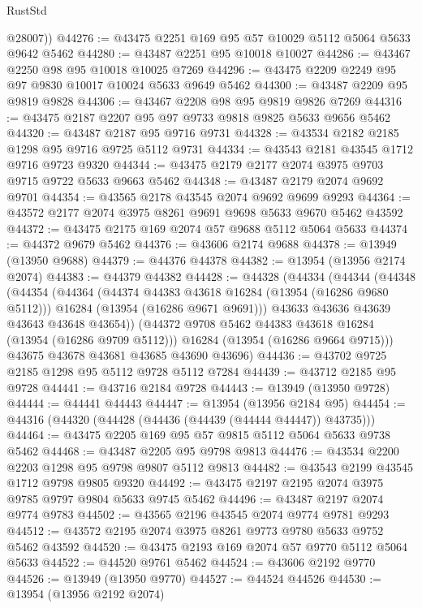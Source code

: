 \begin{lexlean}{RustStd}
\begin{coremodule}
        @28007))
@44276 := @43475 @2251 @169 @95 @57 @10029 @5112 @5064 @5633 @9642 @5462
@44280 := @43487 @2251 @95 @10018 @10027
@44286 := @43467 @2250 @98 @95 @10018 @10025 @7269
@44296 := @43475 @2209 @2249 @95 @97 @9830 @10017 @10024 @5633 @9649 @5462
@44300 := @43487 @2209 @95 @9819 @9828
@44306 := @43467 @2208 @98 @95 @9819 @9826 @7269
@44316 := @43475 @2187 @2207 @95 @97 @9733 @9818 @9825 @5633 @9656 @5462
@44320 := @43487 @2187 @95 @9716 @9731
@44328 := @43534 @2182 @2185 @1298 @95 @9716 @9725 @5112 @9731
@44334 := @43543 @2181 @43545 @1712 @9716 @9723 @9320
@44344 := @43475 @2179 @2177 @2074 @3975 @9703 @9715 @9722 @5633 @9663 @5462
@44348 := @43487 @2179 @2074 @9692 @9701
@44354 := @43565 @2178 @43545 @2074 @9692 @9699 @9293
@44364 := @43572 @2177 @2074 @3975 @8261 @9691 @9698 @5633 @9670 @5462 @43592
@44372 := @43475 @2175 @169 @2074 @57 @9688 @5112 @5064 @5633
@44374 := @44372 @9679 @5462
@44376 := @43606 @2174 @9688
@44378 := @13949 (@13950 @9688)
@44379 := @44376 @44378
@44382 := @13954 (@13956 @2174 @2074)
@44383 := @44379 @44382
@44428 := @44328
    (@44334
      (@44344
        (@44348
          (@44354
            (@44364
              (@44374 @44383 @43618 @16284 (@13954 (@16286 @9680 @5112)))
              @16284
              (@13954 (@16286 @9671 @9691)))
            @43633
            @43636
            @43639
            @43643
            @43648
            @43654))
        (@44372 @9708 @5462 @44383 @43618 @16284 (@13954 (@16286 @9709 @5112)))
        @16284
        (@13954 (@16286 @9664 @9715)))
      @43675
      @43678
      @43681
      @43685
      @43690
      @43696)
@44436 := @43702 @9725 @2185 @1298 @95 @5112 @9728 @5112 @7284
@44439 := @43712 @2185 @95 @9728
@44441 := @43716 @2184 @9728
@44443 := @13949 (@13950 @9728)
@44444 := @44441 @44443
@44447 := @13954 (@13956 @2184 @95)
@44454 := @44316 (@44320 (@44428 (@44436 (@44439 (@44444 @44447)) @43735)))
@44464 := @43475 @2205 @169 @95 @57 @9815 @5112 @5064 @5633 @9738 @5462
@44468 := @43487 @2205 @95 @9798 @9813
@44476 := @43534 @2200 @2203 @1298 @95 @9798 @9807 @5112 @9813
@44482 := @43543 @2199 @43545 @1712 @9798 @9805 @9320
@44492 := @43475 @2197 @2195 @2074 @3975 @9785 @9797 @9804 @5633 @9745 @5462
@44496 := @43487 @2197 @2074 @9774 @9783
@44502 := @43565 @2196 @43545 @2074 @9774 @9781 @9293
@44512 := @43572 @2195 @2074 @3975 @8261 @9773 @9780 @5633 @9752 @5462 @43592
@44520 := @43475 @2193 @169 @2074 @57 @9770 @5112 @5064 @5633
@44522 := @44520 @9761 @5462
@44524 := @43606 @2192 @9770
@44526 := @13949 (@13950 @9770)
@44527 := @44524 @44526
@44530 := @13954 (@13956 @2192 @2074)

\end{coremodule}
\end{lexlean}

